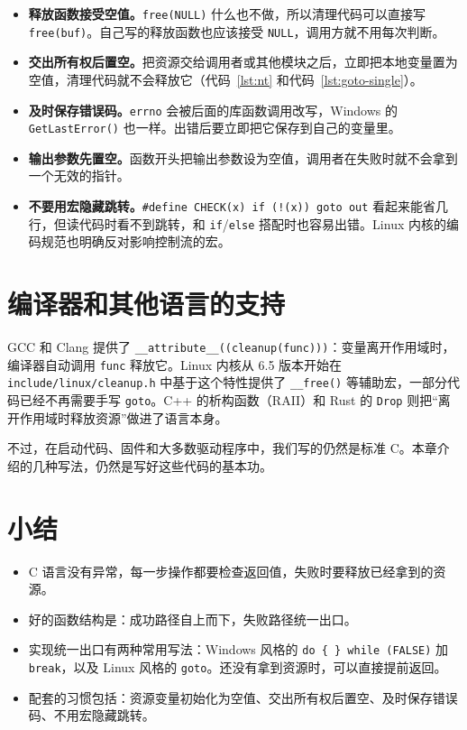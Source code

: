 \begin{itemize}
  \item \textbf{释放函数接受空值。}\texttt{free(NULL)} 什么也不做，所以清理代码可以直接写 \texttt{free(buf)}。自己写的释放函数也应该接受 \texttt{NULL}，调用方就不用每次判断。
  \item \textbf{交出所有权后置空。}把资源交给调用者或其他模块之后，立即把本地变量置为空值，清理代码就不会释放它（代码~\ref{lst:nt} 和代码~\ref{lst:goto-single}）。
  \item \textbf{及时保存错误码。}\texttt{errno} 会被后面的库函数调用改写，Windows 的 \texttt{GetLastError()} 也一样。出错后要立即把它保存到自己的变量里。
  \item \textbf{输出参数先置空。}函数开头把输出参数设为空值，调用者在失败时就不会拿到一个无效的指针。
  \item \textbf{不要用宏隐藏跳转。}\texttt{\#define CHECK(x) if (!(x)) goto out} 看起来能省几行，但读代码时看不到跳转，和 \texttt{if}/\texttt{else} 搭配时也容易出错。Linux 内核的编码规范也明确反对影响控制流的宏\cite{linux-coding-style}。
\end{itemize}

\section{编译器和其他语言的支持}

GCC 和 Clang 提供了 \texttt{\_\_attribute\_\_((cleanup(func)))}：变量离开作用域时，编译器自动调用 \texttt{func} 释放它。Linux 内核从 6.5 版本开始在 \texttt{include/linux/cleanup.h} 中基于这个特性提供了 \texttt{\_\_free()} 等辅助宏，一部分代码已经不再需要手写 \texttt{goto}。C++ 的析构函数（RAII）和 Rust 的 \texttt{Drop} 则把“离开作用域时释放资源”做进了语言本身。

不过，在启动代码、固件和大多数驱动程序中，我们写的仍然是标准 C。本章介绍的几种写法，仍然是写好这些代码的基本功。

\section{小结}

\begin{itemize}
  \item C 语言没有异常，每一步操作都要检查返回值，失败时要释放已经拿到的资源。
  \item 好的函数结构是：成功路径自上而下，失败路径统一出口。
  \item 实现统一出口有两种常用写法：Windows 风格的 \texttt{do \{ \} while (FALSE)} 加 \texttt{break}，以及 Linux 风格的 \texttt{goto}。还没有拿到资源时，可以直接提前返回。
  \item 配套的习惯包括：资源变量初始化为空值、交出所有权后置空、及时保存错误码、不用宏隐藏跳转。
\end{itemize}

